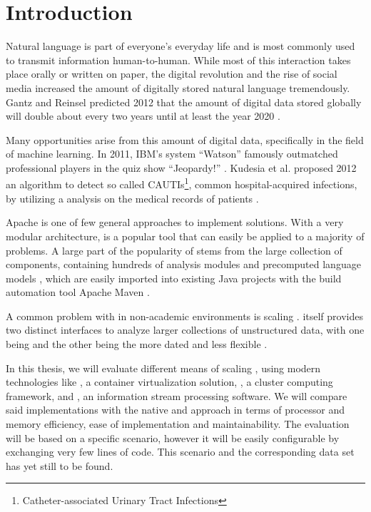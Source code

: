 \chapter{Introduction}

Natural language is part of everyone's everyday life and is most commonly used to transmit information human-to-human. While most of this interaction takes place orally or written on paper, the digital revolution and the rise of social media increased the amount of digitally stored natural language tremendously. Gantz and Reinsel predicted 2012 that the amount of digital data stored globally will double about every two years until at least the year 2020 \cite{gantz2012digital}.

Many opportunities arise from this amount of digital data, specifically in the field of machine learning. In 2011, IBM's \qa{} system ``Watson'' famously outmatched professional players in the quiz show ``Jeopardy!'' \cite{ferrucci2012introduction,epstein2012making}. Kudesia et al. proposed 2012 an algorithm to detect so called CAUTIs\footnote{Catheter-associated Urinary Tract Infections}, common hospital-acquired infections, by utilizing a \nlp{} analysis on the medical records of patients \cite{kudesia2012natural}.

Apache \uima{} is one of few general approaches to implement \nlp{} solutions. With a very modular architecture, \uima{} is a popular tool that can easily be applied to a majority of \nlp{} problems. A large part of the popularity of \uima{} stems from the large \dkpro{} collection of components, containing hundreds of analysis modules and precomputed language models \cite{eckartdecastilho-gurevych:2014:OIAF4HLT}, which are easily imported into existing Java projects with the build automation tool Apache Maven \cite{dkpro}.

A common problem with \uima{} in non-academic environments is scaling \cite{divita2015scaling,epstein2012making,ramakrishnan2010building}. \uima{} itself provides two distinct interfaces to analyze larger collections of unstructured data, with one being \uimaas{} and the other being the more dated and less flexible \cpe{} \cite{OASIS:UIMA:2009}.

In this thesis, we will evaluate different means of scaling \uima{}, using modern technologies like \docker{}, a container virtualization solution, \spark{}, a cluster computing framework, and \kafka{}, an information stream processing software. We will compare said implementations with the native \uimaas{} and \cpe{} approach in terms of processor and memory efficiency, ease of implementation and maintainability. The evaluation will be based on a specific scenario, however it will be easily configurable by exchanging very few lines of code. This scenario and the corresponding data set has yet still to be found.


